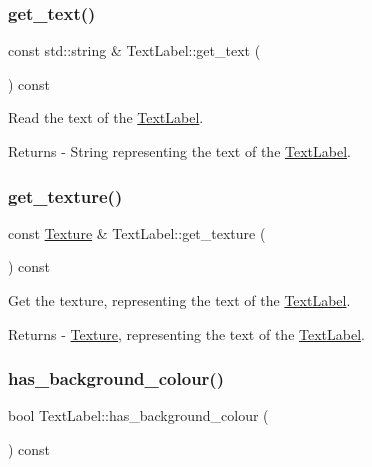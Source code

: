 \subsubsection{\texorpdfstring{get\+\_\+text()}{get\_text()}}
{\footnotesize\ttfamily const std\+::string \& Text\+Label\+::get\+\_\+text (\begin{DoxyParamCaption}{ }\end{DoxyParamCaption}) const}

Read the text of the \mbox{\hyperlink{class_text_label}{Text\+Label}}. \begin{DoxyReturn}{Returns}
-\/ String representing the text of the \mbox{\hyperlink{class_text_label}{Text\+Label}}. 
\end{DoxyReturn}
\mbox{\label{class_text_label_ab8af6195b3e568d5f8a83024818b6d80}} 
\subsubsection{\texorpdfstring{get\+\_\+texture()}{get\_texture()}}
{\footnotesize\ttfamily const \mbox{\hyperlink{class_texture}{Texture}} \& Text\+Label\+::get\+\_\+texture (\begin{DoxyParamCaption}{ }\end{DoxyParamCaption}) const}

Get the texture, representing the text of the \mbox{\hyperlink{class_text_label}{Text\+Label}}. \begin{DoxyReturn}{Returns}
-\/ \mbox{\hyperlink{class_texture}{Texture}}, representing the text of the \mbox{\hyperlink{class_text_label}{Text\+Label}}. 
\end{DoxyReturn}
\mbox{\label{class_text_label_a551d9e453aed5769c47bf815f3954b87}} 
\subsubsection{\texorpdfstring{has\+\_\+background\+\_\+colour()}{has\_background\_colour()}}
{\footnotesize\ttfamily bool Text\+Label\+::has\+\_\+background\+\_\+colour (\begin{DoxyParamCaption}{ }\end{DoxyParamCaption}) const}

